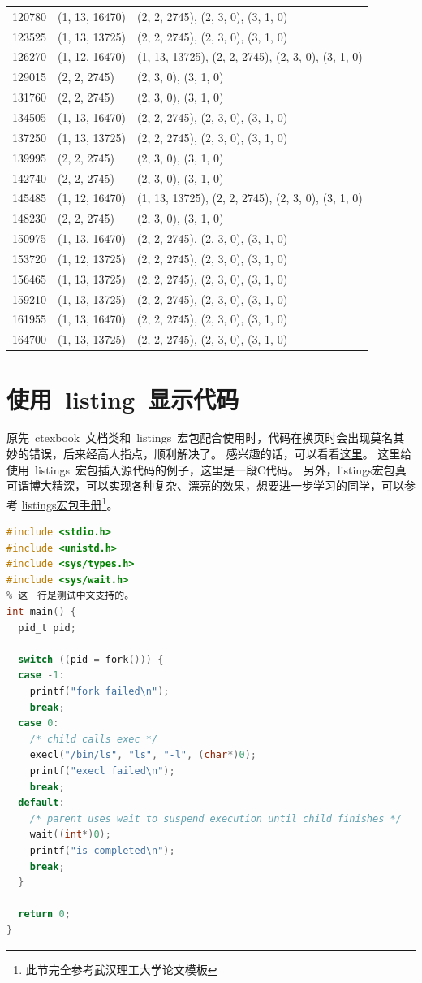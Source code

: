 \begin{center}
\begin{longtable}{|l|l|l|}
120780 & (1, 13, 16470) & (2, 2, 2745), (2, 3, 0), (3, 1, 0) \\
123525 & (1, 13, 13725) & (2, 2, 2745), (2, 3, 0), (3, 1, 0) \\
126270 & (1, 12, 16470) & (1, 13, 13725), (2, 2, 2745), (2, 3, 0), (3, 1, 0) \\
129015 & (2, 2, 2745) & (2, 3, 0), (3, 1, 0) \\
131760 & (2, 2, 2745) & (2, 3, 0), (3, 1, 0) \\
134505 & (1, 13, 16470) & (2, 2, 2745), (2, 3, 0), (3, 1, 0) \\
137250 & (1, 13, 13725) & (2, 2, 2745), (2, 3, 0), (3, 1, 0) \\
139995 & (2, 2, 2745) & (2, 3, 0), (3, 1, 0) \\
142740 & (2, 2, 2745) & (2, 3, 0), (3, 1, 0) \\
145485 & (1, 12, 16470) & (1, 13, 13725), (2, 2, 2745), (2, 3, 0), (3, 1, 0) \\
148230 & (2, 2, 2745) & (2, 3, 0), (3, 1, 0) \\
150975 & (1, 13, 16470) & (2, 2, 2745), (2, 3, 0), (3, 1, 0) \\
153720 & (1, 12, 13725) & (2, 2, 2745), (2, 3, 0), (3, 1, 0) \\
156465 & (1, 13, 13725) & (2, 2, 2745), (2, 3, 0), (3, 1, 0) \\
159210 & (1, 13, 13725) & (2, 2, 2745), (2, 3, 0), (3, 1, 0) \\
161955 & (1, 13, 16470) & (2, 2, 2745), (2, 3, 0), (3, 1, 0) \\
164700 & (1, 13, 13725) & (2, 2, 2745), (2, 3, 0), (3, 1, 0) \\
\end{longtable}
\end{center}
    \section{使用~listing~显示代码}
原先~ctexbook~文档类和~listings~宏包配合使用时，代码在换页时会出现莫名其妙的错误，后来经高人指点，顺利解决了。
感兴趣的话，可以看看\href{http://bbs.ctex.org/viewthread.php?tid=53451}{这里}。
这里给使用~listings~宏包插入源代码的例子，这里是一段C代码。
另外，listings宏包真可谓博大精深，可以实现各种复杂、漂亮的效果，想要进一步学习的同学，可以参考
\href{http://mirror.ctan.org/macros/latex/contrib/listings/listings.pdf}{listings宏包手册\footnote{此节完全参考武汉理工大学论文模板}}。

\begin{lstlisting}[language={C}, caption={一段C源代码}]
#include <stdio.h>
#include <unistd.h>
#include <sys/types.h>
#include <sys/wait.h>
% 这一行是测试中文支持的。
int main() {
  pid_t pid;

  switch ((pid = fork())) {
  case -1:
    printf("fork failed\n");
    break;
  case 0:
    /* child calls exec */
    execl("/bin/ls", "ls", "-l", (char*)0);
    printf("execl failed\n");
    break;
  default:
    /* parent uses wait to suspend execution until child finishes */
    wait((int*)0);
    printf("is completed\n");
    break;
  }

  return 0;
}
\end{lstlisting}

